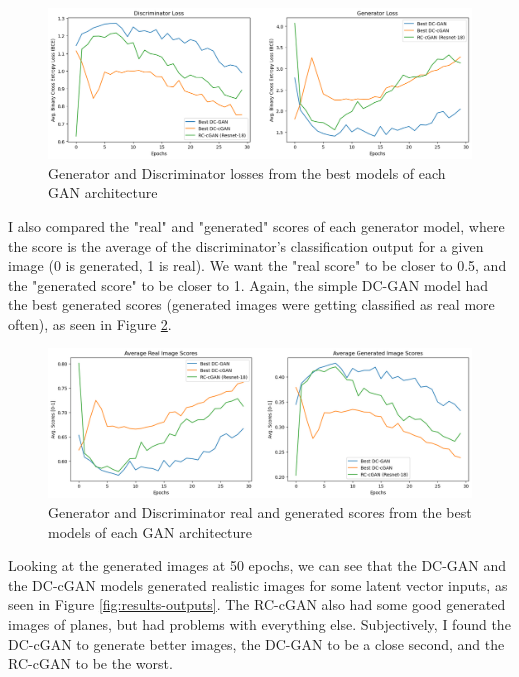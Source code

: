 \documentclass[twoside,11pt]{article}
\begin{document}
\begin{figure}[h!]
  \centering
  \includegraphics[width=16cm]{images/results-losses.png}
  \caption{Generator and Discriminator losses from the best models of each GAN architecture}
  \label{fig:results-losses}
\end{figure}

I also compared the "real" and "generated" scores of each generator model, where the score is the average of the discriminator's classification output for a given image (0 is generated, 1 is real). We want the "real score" to be closer to 0.5, and the "generated score" to be closer to 1. Again, the simple DC-GAN model had the best generated scores (generated images were getting classified as real more often), as seen in Figure \ref{fig:results-scores}.

\begin{figure}[h!]
  \centering
  \includegraphics[width=16cm]{images/results-scores.png}
  \caption{Generator and Discriminator real and generated scores from the best models of each GAN architecture}
  \label{fig:results-scores}
\end{figure}

Looking at the generated images at 50 epochs, we can see that the DC-GAN and the DC-cGAN models generated realistic images for some latent vector inputs, as seen in Figure \ref{fig:results-outputs}. The RC-cGAN also had some good generated images of planes, but had problems with everything else. Subjectively, I found the DC-cGAN to generate better images, the DC-GAN to be a close second, and the RC-cGAN to be the worst.
\end{document}
